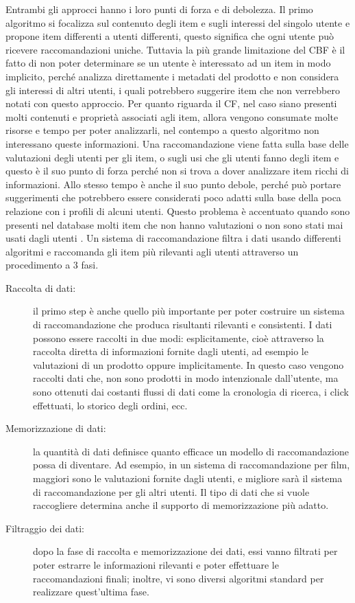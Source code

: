 Entrambi gli approcci hanno i loro punti di forza e di debolezza. Il primo algoritmo si focalizza sul contenuto degli item e 
sugli interessi del singolo utente e propone item differenti a utenti differenti, questo significa che ogni utente può ricevere 
raccomandazioni uniche. 
Tuttavia la più grande limitazione del CBF è il fatto di non poter determinare se un utente è interessato ad un item in modo implicito, 
perché analizza direttamente i metadati del prodotto e non considera gli interessi di altri utenti, i quali potrebbero 
suggerire item che non verrebbero notati con questo approccio.
Per quanto riguarda il CF, nel caso siano presenti molti contenuti e proprietà associati agli item, allora vengono consumate molte 
risorse e tempo per poter analizzarli, nel contempo a questo algoritmo non interessano queste informazioni. Una raccomandazione 
viene fatta sulla base delle valutazioni degli utenti per gli item, o sugli usi che gli utenti fanno degli item e questo è il suo punto 
di forza perché non si trova a dover analizzare item ricchi di informazioni. Allo stesso tempo è anche il suo punto debole, perché può 
portare suggerimenti che potrebbero essere considerati poco adatti sulla base della poca relazione con i profili di alcuni utenti. 
Questo problema è accentuato quando sono presenti nel database molti item che non hanno valutazioni o non sono stati mai usati dagli 
utenti \cite{model-based-approach-for-collaborative-filtering}.
\vspace{0.5 cm}
\hfill\break
Un sistema di raccomandazione filtra i dati usando differenti algoritmi e raccomanda gli item più rilevanti agli utenti attraverso 
un procedimento a 3 fasi.
\begin{description}
    \item[Raccolta di dati:] il primo step è anche quello più importante per poter costruire un sistema di 
    raccomandazione che produca risultanti rilevanti e consistenti. I dati possono essere raccolti in due modi: esplicitamente, 
    cioè attraverso la raccolta diretta di informazioni fornite dagli utenti, ad esempio le valutazioni di un prodotto oppure 
    implicitamente. In questo caso vengono raccolti dati che, non sono prodotti in modo intenzionale dall'utente, ma sono ottenuti 
    dai costanti flussi di dati come la cronologia di ricerca, i click effettuati, lo storico degli ordini, ecc.
    \item[Memorizzazione di dati:] la quantità di dati definisce quanto efficace un modello di raccomandazione possa di 
    diventare. Ad esempio, in un sistema di raccomandazione per film, maggiori sono le valutazioni fornite dagli utenti, e 
    migliore sarà il sistema di raccomandazione per gli altri utenti. Il tipo di dati che si vuole raccogliere determina 
    anche il supporto di memorizzazione più adatto.
    \item[Filtraggio dei dati:] dopo la fase di raccolta e memorizzazione dei dati, essi vanno filtrati per poter estrarre 
    le informazioni rilevanti e poter effettuare le raccomandazioni finali; inoltre, vi sono diversi algoritmi standard per 
    realizzare quest'ultima fase.
\end{description}
%
